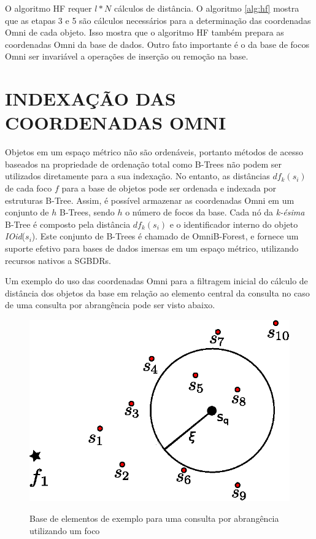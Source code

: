 O algoritmo HF requer $l*N$ cálculos de distância. O algoritmo \ref{alg:hf} mostra que as etapas 3 e 5 são cálculos
necessários para a determinação das coordenadas Omni de cada objeto. Isso mostra que o algoritmo HF também prepara as
coordenadas Omni da base de dados. Outro fato importante é o da base de focos Omni ser invariável a operações de inserção
ou remoção na base.

\section{INDEXAÇÃO DAS COORDENADAS OMNI}
\label{sec:indexomni}

Objetos em um espaço métrico não são ordenáveis, portanto métodos de acesso baseados na propriedade de ordenação total
como B-Trees não podem ser utilizados diretamente para a sua indexação. No entanto, as distâncias $df_k(s_i)$ de cada foco
$f$ para a base de objetos pode ser ordenada e indexada por estruturas B-Tree. Assim, é possível armazenar as coordenadas Omni
em um conjunto de $h$ B-Trees, sendo $h$ o número de focos da base. Cada nó da \textit{k-ésima} B-Tree é composto pela distância $df_k(s_i)$
e o identificador interno do objeto \textit{IOid}($s_i$). Este conjunto de B-Trees é chamado de OmniB-Forest, e fornece 
um suporte efetivo para bases de dados imersas em um espaço métrico, utilizando recursos nativos a SGBDRs.\par

Um exemplo do uso das coordenadas Omni para a filtragem inicial do cálculo de distância dos objetos da base em relação ao elemento central da consulta no caso de uma consulta por
abrangência pode ser visto abaixo.

\begin{figure}[H]
\centering
\caption{Base de elementos de exemplo para uma consulta por abrangência utilizando um foco}
\includegraphics[width=.55\textwidth]{dados/figuras/rg_ex1.eps}
\label{fig:rgex1}
\end{figure}

